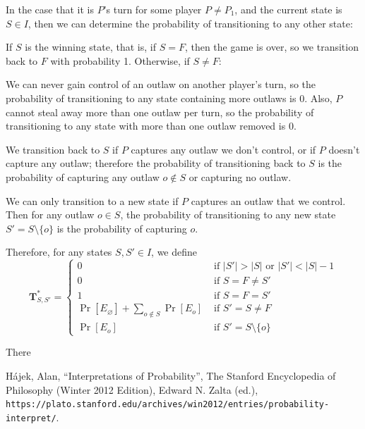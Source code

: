 \documentclass{article}
\newcommand{\T}{\textbf{{T}}}
\theoremstyle{definition}
\theoremstyle{plain}
\begin{document}
	In the case that it is $P$'s turn for some player $P \neq P_1$, and the current state is $S \in I$, then we can determine the probability of transitioning to any other state:

	If $S$ is the winning state, that is, if $S = F$, then the game is over, so we transition back to $F$ with probability 1. Otherwise, if $S \neq F$:

	We can never gain control of an outlaw on another player's turn, so the probability of transitioning to any state containing more outlaws is 0. Also, $P$ cannot steal away more than one outlaw per turn, so the probability of transitioning to any state with more than one outlaw removed is 0.

	We transition back to $S$ if $P$ captures any outlaw we don't control, or if $P$ doesn't capture any outlaw; therefore the probability of transitioning back to $S$ is the probability of capturing any outlaw $o \not \in S$ or capturing no outlaw.

	We can only transition to a new state if $P$ captures an outlaw that we control. Then for any outlaw $o \in S$, the probability of transitioning to any new state $S' = S \setminus \{o\}$ is the probability of capturing $o$.
	
	Therefore, for any states $S, S' \in I$, we define \[\T^*_{S, S'} =
	\begin{cases}
	0 &\text{ if $|S'| > |S|$ or $|S'| < |S| - 1$}\\
	0 &\text{ if $S = F \neq S'$}\\
	1 &\text{ if $S = F = S'$}\\
	\Pr[E_\varnothing] + \sum\limits_{o \not \in S} \Pr[E_o] &\text{ if $S' = S \neq F$}\\
	\Pr[E_o] &\text{ if $S' = S \setminus \{o\}$}
	\end{cases}\]

	There
	
	\begin{thebibliography}{9}
		H\'{a}jek, Alan, ``Interpretations of Probability'', The Stanford Encyclopedia of Philosophy (Winter 2012 Edition), Edward N. Zalta (ed.), \texttt{https://plato.stanford.edu/archives/win2012/entries/probability-interpret/}.
	\end{thebibliography}
\end{document}
